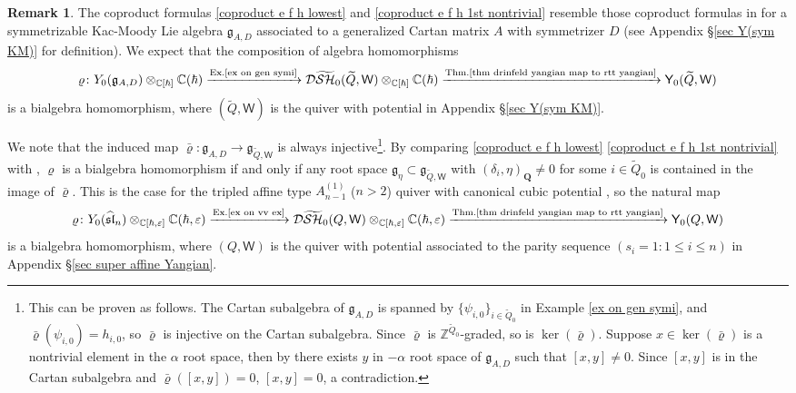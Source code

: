 \documentclass[10pt]{amsart}
\theoremstyle{definition}
\newtheorem{Remark}[Theorem]{Remark}
\numberwithin{equation}{section}
\newcommand{\bC}{\mathbb{C}}
\newcommand{\bZ}{\mathbb{Z}}
\newcommand{\sW}{\mathsf{W}}
\begin{document}
\begin{Remark}\label{rmk on copr compa}
The coproduct formulas \eqref{coproduct e f h lowest} and \eqref{coproduct e f h 1st nontrivial} resemble those coproduct formulas in \cite[Def.\,4.6]{GNW} for a symmetrizable Kac-Moody Lie algebra $\mathfrak{g}_{A,D}$ associated to a generalized Cartan matrix $A$ with symmetrizer $D$ (see Appendix \S \ref{sec Y(sym KM)} for definition). We expect that the composition of algebra homomorphisms 
\begin{equation}\label{equ on bialg map for sym km}\varrho\colon Y_{0}(\mathfrak{g}_{A,D})\otimes_{\bC[\hbar]}\bC(\hbar)\xrightarrow{\text{Ex.\ref{ex on gen symi}}} \mathcal D\widetilde{\mathcal{SH}}_0(\widetilde{Q},\sW)\otimes_{\bC[\hbar]}\bC(\hbar)\xrightarrow{\text{Thm.\ref{thm drinfeld yangian map to rtt yangian}}} \mathsf Y_0(\widetilde{Q},\sW) \end{equation} is a bialgebra homomorphism, where $(\widetilde{Q},\sW)$ is the quiver with potential in Appendix \S \ref{sec Y(sym KM)}. 

We note that the induced map $\bar\varrho\colon \mathfrak{g}_{A,D}\to \mathfrak{g}_{\widetilde{Q},\sW}$ is always injective\footnote{This can be proven as follows. The Cartan subalgebra of $\mathfrak{g}_{A,D}$ is spanned by $\{\psi_{i,0}\}_{i\in \widetilde{Q}_0}$ in Example \ref{ex on gen symi}, and $\bar\varrho(\psi_{i,0})=h_{i,0}$, so $\bar\varrho$ is injective on the Cartan subalgebra. Since $\bar\varrho$ is $\bZ^{\widetilde{Q}_0}$-graded, so is $\ker(\bar\varrho)$. Suppose $x\in\ker(\bar\varrho)$ is a nontrivial element in the $\alpha$ root space, then by \cite[Thm.~2.2]{Kac} there exists $y$ in $-\alpha$ root space of $\mathfrak{g}_{A,D}$ such that $[x,y]\neq 0$. Since $[x,y]$ is in the Cartan subalgebra and $\bar\varrho([x,y])=0$, $[x,y]=0$, a contradiction.}. By comparing \eqref{coproduct e f h lowest} \eqref{coproduct e f h 1st nontrivial} with \cite[(4.7)]{GNW}, $\varrho$ is a bialgebra homomorphism if and only if any root space $\mathfrak{g}_\eta\subset \mathfrak{g}_{\widetilde{Q},\sW}$ with $(\delta_i,\eta)_{\pmb Q}\neq 0$ for some $i\in \widetilde{Q}_0$ is contained in the image of $\bar{\varrho}$. This is the case for the tripled affine type $A^{(1)}_{n-1}$ ($n>2$) quiver with canonical cubic potential \cite{Jin}, so the natural map
\begin{equation}\label{equ on bialg map for affine type A}\varrho\colon Y_{0}(\widehat{\mathfrak{sl}}_n)\otimes_{\bC[\hbar,\varepsilon]}\bC(\hbar,\varepsilon)\xrightarrow{\text{Ex.\ref{ex on vv ex}}} \mathcal D\widetilde{\mathcal{SH}}_0(Q,\sW)\otimes_{\bC[\hbar,\varepsilon]}\bC(\hbar,\varepsilon)\xrightarrow{\text{Thm.\ref{thm drinfeld yangian map to rtt yangian}}} \mathsf Y_0(Q,\sW) \end{equation}
is a bialgebra homomorphism, where $(Q,\sW)$ is the quiver with potential associated to the parity sequence $(s_i=1:1\leqslant i\leqslant n)$ in Appendix \S \ref{sec super affine Yangian}.


\end{Remark}
\end{document}
